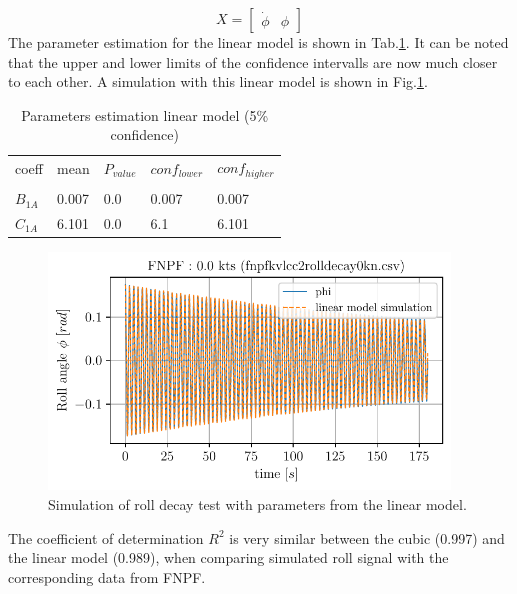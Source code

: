 \begin{equation}
X = \left[\begin{matrix}\dot{\phi} & \phi\end{matrix}\right]
\label{eq:eq_X2}
\end{equation}
The parameter estimation for the linear model is shown in
Tab.\ref{tab:parameters2}. It can be noted that the upper and
lower limits of the confidence intervalls are now much closer to each
other. A simulation with this linear model is shown in
Fig.\ref{fig:sim_linear}.
\begin{table}[H]
\scriptsize
\center
\caption{Parameters estimation linear model (5\% confidence)}
\label{tab:parameters2}
\begin{tabular}{|l|l|l|l|l|}
\hline\addlinespace
coeff & mean & $P_{value}$ & $conf_{lower}$ & $conf_{higher}$\\
&  &  &  & \\
\hline$B_{1A}$ & 0.007 & 0.0 & 0.007 & 0.007\\
$C_{1A}$ & 6.101 & 0.0 & 6.1 & 6.101\\
\hline
\end{tabular}
\end{table}
\begin{figure}[H]
\begin{center}\includegraphics[width = 0.95\textwidth]{figures/sim_linear.pdf}\end{center}
\vspace{-0.7cm}
\caption{Simulation of roll decay test with parameters from the linear model.}
\label{fig:sim_linear}
\end{figure}
The coefficient of determination $R^2$ is very similar between the
cubic (0.997) and the linear model (0.989), when comparing simulated
roll signal with the corresponding data from FNPF.
